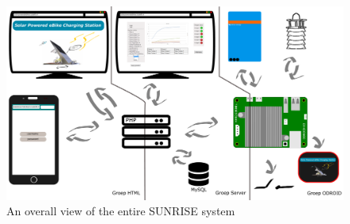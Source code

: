 \begin{figure}[!ht]
  \centering
    \includegraphics[width=1.0\textwidth]{images/project_overview.pdf}
      \caption{An overall view of the entire SUNRISE system}\label{fig:project_overview}
\end{figure}